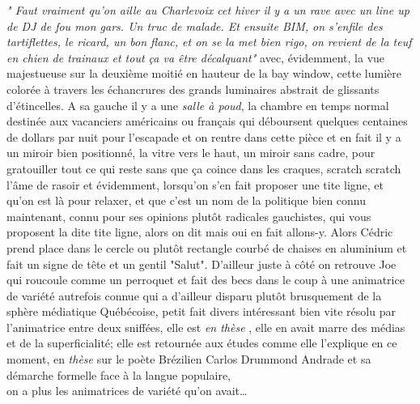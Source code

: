 \begin{paracol}{2}

\phantom
\small
\textit{"\textelp{} Faut vraiment qu'on aille au Charlevoix cet hiver
il y a un rave avec un line up de DJ de fou mon gars. Un truc de malade. 
Et ensuite BIM, on s'enfile des tartiflettes, le ricard, un bon flanc, 
et on se la met bien rigo, on revient de la teuf en chien de trainaux
et tout ça va être décalquant"}
\switchcolumn
{}
avec, évidemment, la vue majestueuse sur la deuxième moitié en hauteur de la bay
window, cette lumière colorée à travers les échancrures des grands luminaires
abstrait de glissants d'étincelles.  
A sa gauche il y a une \emph{salle à poud}, la chambre en temps normal 
destinée aux vacanciers
américains ou français qui déboursent quelques centaines de dollars par nuit
pour l'escapade et on rentre dans cette pièce
et en fait il y a un miroir bien positionné, la vitre vers le haut, un miroir
sans cadre, pour gratouiller tout ce qui reste sans que ça coince dans les
craques, scratch scratch l'âme de rasoir et évidemment, lorsqu'on s'en fait
proposer une tite ligne, et qu'on est là pour relaxer, et que c'est un nom de
la politique bien connu maintenant, connu pour ses opinions plutôt radicales
gauchistes, qui vous proposent la dite tite ligne, alors on dit mais oui en fait
allons-y. Alors Cédric prend place dans le cercle ou plutôt rectangle courbé
de chaises en aluminium et fait un signe de tête et un gentil "Salut". 
D'ailleur juste à côté on retrouve Joe qui roucoule comme un
perroquet et fait des becs dans le coup à une animatrice
de variété autrefois connue qui a d'ailleur disparu plutôt brusquement de la
sphère médiatique Québécoise, petit fait divers intéressant bien vite résolu par
l'animatrice entre deux sniffées, elle est \emph{en thèse} , elle en avait marre
des médias et de la superficialité; elle est retournée aux études comme elle
l'explique en ce moment, en \emph{thèse} sur le poète Brézilien Carlos Drummond
Andrade et sa démarche formelle face à la langue populaire, \\ on a plus les
animatrices de variété qu'on avait\ldots
\end{paracol}

